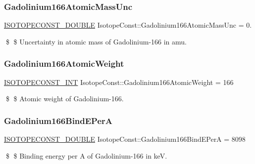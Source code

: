 \subsubsection{\texorpdfstring{Gadolinium166\+Atomic\+Mass\+Unc}{Gadolinium166AtomicMassUnc}}
{\footnotesize\ttfamily \mbox{\hyperlink{group___isotope_const-_macros_ga8f45a7272ce02c0b4c65c44636ed719a}{I\+S\+O\+T\+O\+P\+E\+C\+O\+N\+S\+T\+\_\+\+D\+O\+U\+B\+LE}} Isotope\+Const\+::\+Gadolinium166\+Atomic\+Mass\+Unc = 0.}

\$ \$ Uncertainty in atomic mass of Gadolinium-\/166 in amu. \mbox{\label{group___isotope_const-_gadolinium-_gd166_ga44d1bb11c193451e9fbbc8ccd40c4c34}} 
\subsubsection{\texorpdfstring{Gadolinium166\+Atomic\+Weight}{Gadolinium166AtomicWeight}}
{\footnotesize\ttfamily \mbox{\hyperlink{group___isotope_const-_macros_ga5f18360b3e99483a35c32d789e62621c}{I\+S\+O\+T\+O\+P\+E\+C\+O\+N\+S\+T\+\_\+\+I\+NT}} Isotope\+Const\+::\+Gadolinium166\+Atomic\+Weight = 166}

\$ \$ Atomic weight of Gadolinium-\/166. \mbox{\label{group___isotope_const-_gadolinium-_gd166_gaa8b8377419733d02aca7da6847a91068}} 
\subsubsection{\texorpdfstring{Gadolinium166\+Bind\+E\+PerA}{Gadolinium166BindEPerA}}
{\footnotesize\ttfamily \mbox{\hyperlink{group___isotope_const-_macros_ga8f45a7272ce02c0b4c65c44636ed719a}{I\+S\+O\+T\+O\+P\+E\+C\+O\+N\+S\+T\+\_\+\+D\+O\+U\+B\+LE}} Isotope\+Const\+::\+Gadolinium166\+Bind\+E\+PerA = 8098}

\$ \$ Binding energy per A of Gadolinium-\/166 in keV. \mbox{\label{group___isotope_const-_gadolinium-_gd166_ga083f751d6ff2ed65538f8683600befff}} 
